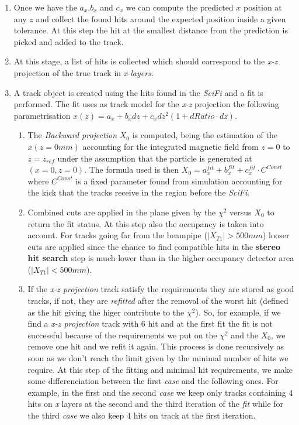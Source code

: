 \documentclass[paper=a4, fontsize=10pt]{scrartcl}
\numberwithin{equation}{section}		%
\numberwithin{figure}{section}			%
\numberwithin{table}{section}				%
\begin{document}
\begin{itemize}
\begin{enumerate}
      \item{Once we have the $a_{x}$,$b_{x}$ and $c_{x}$ we can compute the predicted $x$ position at any $z$ and collect the found hits around the expected position inside a given tolerance. At this step the hit at the smallest distance from the prediction is picked and added to the track.}
      \item{At this stage, a list of hits is collected which should correspond to the \textit{x-z} projection of the true track in \textit{x-layers}.}
      \item{A track object is created using the hits found in the \textit{SciFi} and a fit is performed. The fit uses as track model for the \textit{x-z} projection the following parametrisation $x(z)=a_{x}+b_{x}dz+c_{x}dz^{2}(1+dRatio\cdot dz)$.}
        \begin{enumerate}
           \item{The \textit{Backward projection} $X_{0}$ is computed, being the estimation of the $x(z=0 mm)$ accounting for the integrated magnetic field from $z=0$ to $z=z_{ref}$ under the assumption that the particle is generated at $(x=0,z=0)$. The formula used is then $X_{0} = a^{fit}_{x}+b^{fit}_{x}+c^{fit}_{x} \cdot C^{Const}$ where $C^{Const}$ is a fixed parameter found from simulation accounting for the kick that the tracks receive in the region before the \textit{SciFi}. }
           \item{Combined cuts are applied in the plane given by the $\chi^{2}$ versus $X_{0}$ to return the fit status. At this step also the occupancy is taken into account. For tracks going far from the beampipe ($\left| X_{T1} \right| > 500 mm$) looser cuts are applied since the chance to find compatible hits in the \textbf{stereo hit search} step is much lower than in the higher occupancy detector area ($\left| X_{T1} \right| <500 mm$).}
           \item{If the \textit{x-z projection} track satisfy the requirements they are stored as good tracks, if not, they are \textit{refitted} after the removal of the worst hit (defined as the hit giving the higer contribute to the $\chi^{2}$). So, for example, if we find a \textit{x-z projection} track with 6 hit and at the first fit the fit is not successful because of the requirements we put on the $\chi^{2}$ and the $X_{0}$, we remove one hit and we refit it again. This process is done recursively as soon as we don't reach the limit given by the minimal number of hits we require. At this step of the fitting and minimal hit requirements, we make some differenciation between the first \textit{case} and the following ones. For example, in the first and the second \textit{case} we keep only tracks containing 4 hits on \textit{x} layers at the second and the third iteration of the \textit{fit} while for the third \textit{case} we also keep 4 hits on track at the first iteration.}

\end{enumerate}
\end{enumerate}
\end{itemize}
\end{document}
